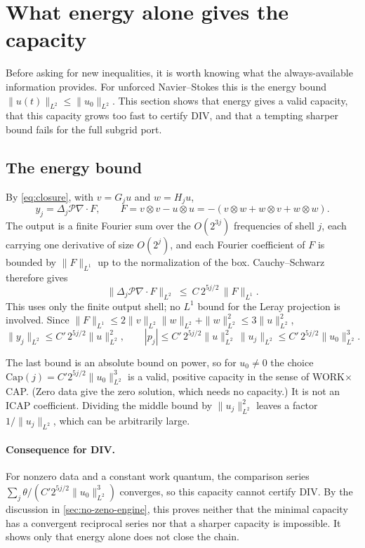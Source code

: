 \section{What energy alone gives the capacity}\label{sec:energy-capacity}

Before asking for new inequalities, it is worth knowing what the always-available information
provides. For unforced Navier--Stokes this is the energy bound $\|u(t)\|_{L^2}\le\|u_0\|_{L^2}$.
This section shows that energy gives a valid capacity, that this capacity grows too fast to
certify DIV, and that a tempting sharper bound fails for the full subgrid port.

\subsection{The energy bound}

By \eqref{eq:closure}, with $v=G_ju$ and $w=H_ju$,
\[
y_j=\Delta_j\mathcal P\nabla\cdot F,\qquad F=v\otimes v-u\otimes u=-(v\otimes w+w\otimes v+w\otimes w).
\]
The output is a finite Fourier sum over the $O(2^{3j})$ frequencies of shell $j$, each carrying one
derivative of size $O(2^j)$, and each Fourier coefficient of $F$ is bounded by $\|F\|_{L^1}$ up to
the normalization of the box. Cauchy--Schwarz therefore gives
\begin{equation}\label{eq:shell-l1}
\|\Delta_j\mathcal P\nabla\cdot F\|_{L^2}\ \le\ C\,2^{5j/2}\,\|F\|_{L^1}.
\end{equation}
This uses only the finite output shell; no $L^1$ bound for the Leray projection is involved.
Since $\|F\|_{L^1}\le2\|v\|_{L^2}\|w\|_{L^2}+\|w\|_{L^2}^2\le 3\|u\|_{L^2}^2$,
\begin{equation}\label{eq:energy-power}
\|y_j\|_{L^2}\le C'\,2^{5j/2}\|u\|_{L^2}^2,\qquad
|p_j|\le C'\,2^{5j/2}\|u\|_{L^2}^2\,\|u_j\|_{L^2}\le C'\,2^{5j/2}\|u_0\|_{L^2}^3 .
\end{equation}

The last bound is an absolute bound on power, so for $u_0\ne0$ the choice
$\mathrm{Cap}(j)=C'2^{5j/2}\|u_0\|_{L^2}^3$ is a valid, positive capacity in the sense of WORK$\times$CAP.
(Zero data give the zero solution, which needs no capacity.) It is not an ICAP coefficient. Dividing the middle bound by
$\|u_j\|_{L^2}^2$ leaves a factor $1/\|u_j\|_{L^2}$, which can be arbitrarily large.

\paragraph{Consequence for DIV.}
For nonzero data and a constant work quantum, the comparison series $\sum_j\theta/(C'2^{5j/2}\|u_0\|_{L^2}^3)$
converges, so this capacity cannot certify DIV. By the discussion in \cref{sec:no-zeno-engine},
this proves neither that the minimal capacity has a convergent reciprocal series nor that a
sharper capacity is impossible. It shows only that energy alone does not close the chain.

